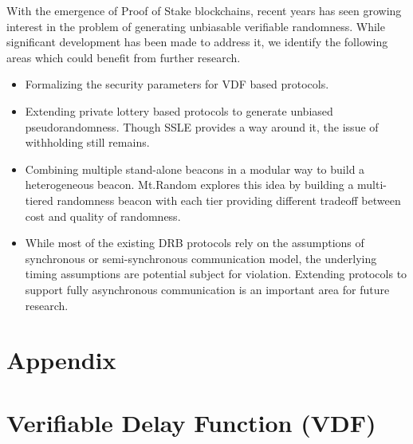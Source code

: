 \documentclass[letterpaper,twocolumn,10pt]{article}
\theoremstyle{definition}
\theoremstyle{remark}
\begin{document}
With the emergence of Proof of Stake blockchains, recent years has seen growing interest in the problem of generating unbiasable verifiable randomness. While significant development has been made to address it, we identify the following areas which could benefit from further research. 
\begin{itemize}
    \item Formalizing the security parameters for VDF based protocols.
    \item Extending private lottery based protocols to generate unbiased pseudorandomness. Though SSLE provides a way around it, the issue of withholding still remains.
    \item Combining multiple stand-alone beacons in a modular way to build a heterogeneous beacon. Mt.Random \cite{cascudomt} explores this idea by building a multi-tiered randomness beacon with each tier providing different tradeoff between cost and quality of randomness.
    \item While most of the existing DRB protocols rely on the assumptions of synchronous or semi-synchronous communication model, the underlying timing assumptions are potential subject for violation. Extending protocols to support fully asynchronous communication is an important area for future research.
\end{itemize}


\printbibliography
\appendix
\section*{Appendix}
\renewcommand{\thesection}{\arabic{section}}

\iffalse

    \section{Verifiable Delay Function (VDF)}
\label{appendix:vdf}
\end{document}

